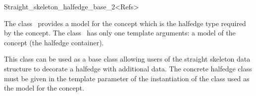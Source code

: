 

\begin{ccRefClass}{Straight_skeleton_halfedge_base_2<Refs>}


\ccDefinition

The class \ccRefName\ provides a model for the
 concept which is the halfedge
type required by the 
concept. The class \ccRefName\ has only one template arguments: a model of the  concept (the halfedge container).

This class can be used as a base class allowing users of the straight skeleton data structure to decorate a halfedge with additional data. The concrete halfedge class must be given in the  template parameter of the instantiation of the  class used as the model for the  concept.


\ccIsModel
{}\\
\\
\\
\\

\ccSeeAlso
{}\\
\\
\\
\\
\end{ccRefClass}


